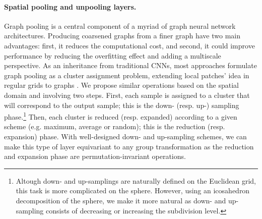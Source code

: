 \documentclass{article}
\begin{document}
\paragraph{Spatial pooling and unpooling layers.} Graph pooling is a central component of a myriad of graph neural network architectures. Producing coarsened graphs from a finer graph have two main advantages: first, it reduces the computational cost, and second, it could improve performance by reducing the overfitting effect and adding a multiscale perspective. As an inheritance from traditional CNNs, most approaches formulate graph pooling as a cluster assignment problem, extending local patches' idea in regular grids to graphs \citep{dhillon2007weighted, ying2018hierarchical, khasahmadi2020memory, mesquita2020rethinking}. We propose similar operations based on the spatial domain and involving two steps. First, each sample is assigned to a cluster that will correspond to the output sample; this is the down- (resp. up-) sampling phase.\footnote{Altough down- and up-samplings are naturally defined on the Euclidean grid, this task is more complicated on the sphere. However, using an icosahedron decomposition of the sphere, we make it more natural as down- and up-sampling consists of decreasing or increasing the subdivision level.}  Then, each cluster is reduced (resp. expanded) according to a given scheme (e.g. maximum, average or random); this is the reduction (resp. expansion) phase. With well-designed down- and up-sampling schemes, we can make this type of layer equivariant to any group transformation as the reduction and expansion phase are permutation-invariant operations.
\end{document}
